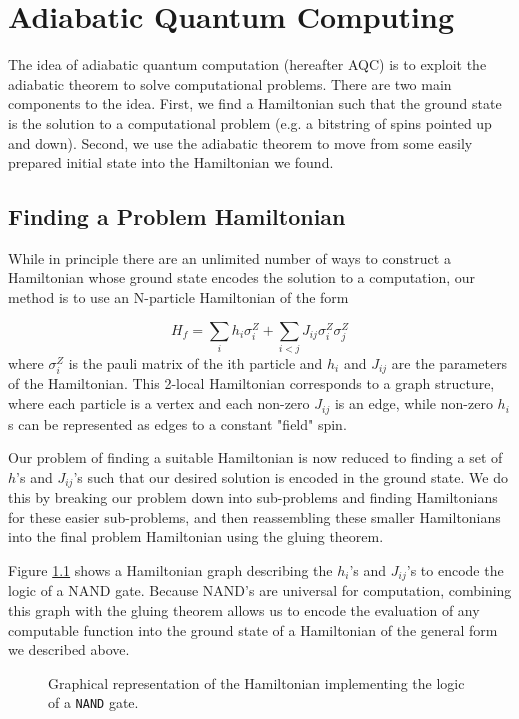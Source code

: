 \chapter{Adiabatic Quantum Computing}
The idea of adiabatic quantum computation (hereafter AQC) is to exploit the adiabatic theorem to solve computational problems.  There are two main components to the idea.  First, we find a Hamiltonian such that the ground state is the solution to a computational problem (e.g. a bitstring of spins pointed up and down).  Second, we use the adiabatic theorem to move from some easily prepared initial state into the Hamiltonian we found.

\section{Finding a Problem Hamiltonian}
While in principle there are an unlimited number of ways to construct a Hamiltonian whose ground state encodes the solution to a computation, our method is to use an N-particle Hamiltonian of the form

\begin{displaymath}
	H_f = \sum_{i} h_i \sigma_i^Z + \sum_{i < j} J_{ij} \sigma_i^Z\sigma_j^Z 
\end{displaymath}
where $\sigma_i^Z$ is the pauli matrix of the ith particle and $h_i$ and $J_{ij}$ are the parameters of the Hamiltonian.  This 2-local Hamiltonian corresponds to a graph structure, where each particle is a vertex and each non-zero $J_{ij}$ is an edge, while non-zero $h_i$s can be represented as edges to a constant "field" spin.

Our problem of finding a suitable Hamiltonian is now reduced to finding a set of $h$'s and $J_{ij}$'s such that our desired solution is encoded in the ground state.  We do this by breaking our problem down into sub-problems and finding Hamiltonians for these easier sub-problems, and then reassembling these smaller Hamiltonians into the final problem Hamiltonian using the gluing theorem.\cite{gluing}

Figure \ref{fig:nand_graph} shows a Hamiltonian graph describing the $h_i$'s and $J_{ij}$'s to encode the logic of a NAND gate.  Because NAND's are universal for computation, combining this graph with the gluing theorem allows us to encode the evaluation of any computable function into the ground state of a Hamiltonian of the general form we described above.  

\begin{figure}
	\caption[\texttt{NAND} Graph]{Graphical representation of the Hamiltonian implementing the logic of a \texttt{NAND} gate.}
	\label{fig:nand_graph}
\end{figure}


